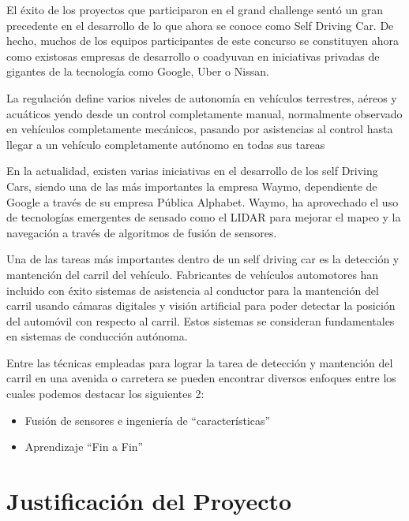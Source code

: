 \documentclass[12pt,letterpaper]{article}
\begin{document}
El éxito de los proyectos que participaron en el grand challenge sentó un gran precedente en el desarrollo de lo que 
ahora se conoce como Self Driving Car. De hecho, muchos de los equipos participantes de este concurso se constituyen 
ahora como existosas empresas de desarrollo o coadyuvan en iniciativas privadas de gigantes de la tecnología 
como Google, Uber o Nissan.

La regulación define varios niveles de autonomía en vehículos terrestres, aéreos y acuáticos yendo desde un control 
completamente manual, normalmente observado en vehículos completamente mecánicos, pasando por asistencias al control 
hasta llegar a un vehículo completamente autónomo en todas sus tareas

En la actualidad, existen varias iniciativas en el desarrollo de los self Driving Cars, siendo una de las más 
importantes la empresa Waymo, dependiente de Google a través de su empresa Pública Alphabet. Waymo, ha aprovechado 
el uso de tecnologías emergentes de sensado como el LIDAR para mejorar el mapeo y la navegación a través de algoritmos 
de fusión de sensores.

Una de las tareas más importantes dentro de un self driving car es la detección y mantención del carril del 
vehículo. Fabricantes de vehículos automotores han incluido con éxito sistemas de asistencia al conductor para la 
mantención del carril usando cámaras digitales y visión artificial para poder detectar la posición del automóvil con 
respecto al carril. Estos sistemas se consideran fundamentales en sistemas de conducción autónoma.

Entre las técnicas empleadas para lograr la tarea de detección y mantención del carril en una avenida o carretera 
se pueden encontrar diversos enfoques entre los cuales podemos destacar los siguientes 2:

\begin{itemize}
    \item Fusión de sensores e ingeniería de ``características''
    \item Aprendizaje ``Fin a Fin''
\end{itemize}

\section{Justificación del Proyecto}
\end{document}
